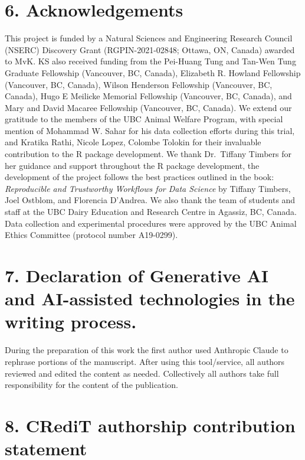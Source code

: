 \documentclass[
]{article}
\begin{document}
\section{6. Acknowledgements}\label{acknowledgements}

This project is funded by a Natural Sciences and Engineering Research
Council (NSERC) Discovery Grant (RGPIN-2021-02848; Ottawa, ON, Canada)
awarded to MvK. KS also received funding from the Pei-Huang Tung and
Tan-Wen Tung Graduate Fellowship (Vancouver, BC, Canada), Elizabeth R.
Howland Fellowship (Vancouver, BC, Canada), Wilson Henderson Fellowship
(Vancouver, BC, Canada), Hugo E Meilicke Memorial Fellowship (Vancouver,
BC, Canada), and Mary and David Macaree Fellowship (Vancouver, BC,
Canada). We extend our gratitude to the members of the UBC Animal
Welfare Program, with special mention of Mohammad W. Sahar for his data
collection efforts during this trial, and Kratika Rathi, Nicole Lopez,
Colombe Tolokin for their invaluable contribution to the R package
development. We thank Dr.~Tiffany Timbers for her guidance and support
throughout the R package development, the development of the project
follows the best practices outlined in the book: \emph{Reproducible and
Trustworthy Workflows for Data Science} by Tiffany Timbers, Joel
Ostblom, and Florencia D'Andrea. We also thank the team of students and
staff at the UBC Dairy Education and Research Centre in Agassiz, BC,
Canada. Data collection and experimental procedures were approved by the
UBC Animal Ethics Committee (protocol number A19-0299).

\section{7. Declaration of Generative AI and AI-assisted technologies in
the writing
process.}\label{declaration-of-generative-ai-and-ai-assisted-technologies-in-the-writing-process.}

During the preparation of this work the first author used Anthropic
Claude to rephrase portions of the manuscript. After using this
tool/service, all authors reviewed and edited the content as needed.
Collectively all authors take full responsibility for the content of the
publication.

\section{8. CRediT authorship contribution
statement}\label{credit-authorship-contribution-statement}
\end{document}
